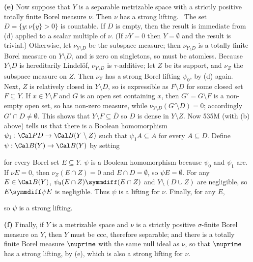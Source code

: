 {\medskip

{\bf (e)} Now suppose that $Y$ is a separable metrizable space with a
strictly positive totally finite Borel measure $\nu$.   Then $\nu$ has a
strong lifting.   \Prf\ The set $D=\{y:\nu\{y\}>0\}$ is countable.   If
$D$ is empty, then the result is immediate from (d) applied to a scalar
multiple of $\nu$.  (If $\nu Y=0$ then $Y=\emptyset$ and the result is
trivial.)    Otherwise, let
$\nu_{Y\setminus D}$ be the subspace measure;  then $\nu_{Y\setminus D}$
is a totally finite Borel measure on $Y\setminus D$, and is zero on
singletons, so must be atomless.   Because $Y\setminus D$ is
hereditarily Lindel\"of, $\nu_{Y\setminus D}$ is $\tau$-additive;  let
$Z$ be its support, and $\nu_Z$ the subspace measure on $Z$.   Then
$\nu_Z$ has a strong Borel lifting $\psi_0$, by (d) again.   Next, $Z$
is relatively closed
in $Y\setminus D$, so is expressible as $F\setminus D$ for some closed
set $F\subseteq Y$.   If $x\in Y\setminus F$ and $G$ is an open set
containing $x$, then $G'=G\setminus F$ is a non-empty open set, so has
non-zero measure, while
$\nu_{Y\setminus D}(G'\setminus D)=0$;  accordingly
$G'\cap D\ne\emptyset$.   This shows that
$Y\setminus F\subseteq\overline{D}$ so $D$ is dense in $Y\setminus Z$.
Now 535M (with (b) above) tells us that there is a Boolean homomorphism
$\psi_1:\Cal PD\to\Cal B(Y\setminus Z)$ such that
$\psi_1A\subseteq\overline{A}$ for every $A\subseteq D$.   Define
$\psi:\Cal B(Y)\to\Cal B(Y)$ by setting


\noindent for every Borel set $E\subseteq Y$.   $\psi$ is a Boolean
homomorphism because $\psi_0$ and $\psi_1$ are.   If $\nu E=0$, then
$\nu_Z(E\cap Z)=0$ and $E\cap D=\emptyset$, so $\psi E=\emptyset$.   
For any $E\in\Cal B(Y)$, $\psi_0(E\cap Z)\symmdiff(E\cap Z)$ and
$Y\setminus(D\cup Z)$ are negligible, so $E\symmdiff\psi E$ is
negligible.   Thus $\psi$ is a lifting for $\nu$.   Finally, for any $E$,


\noindent so $\psi$ is a strong lifting.\ \Qed

\medskip

{\bf (f)} Finally, if $Y$ is a metrizable space and $\nu$ is a strictly
positive $\sigma$-finite Borel measure on $Y$, then $Y$ must be ccc,
therefore separable;  and there is a totally finite Borel measure
$\nuprime$ with the same null ideal as $\nu$, so that $\nuprime$ has a
strong lifting, by (e), which is also a strong lifting for $\nu$.
}%

